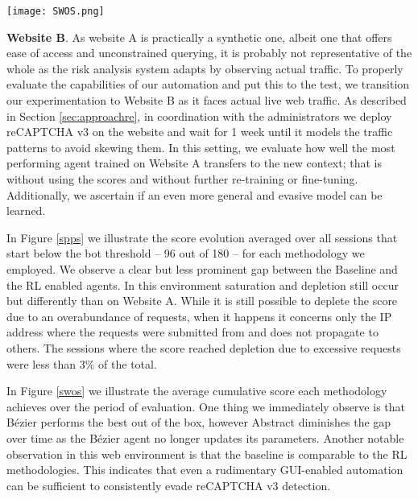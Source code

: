 \begin{figure*}[ht!]
\centerline{\texttt{[image: SWOS.png]}}
\caption{Average cumulative score over the period of evaluation, for Website A and Website B.}
\label{swos}
\end{figure*}

\textbf{Website B}. As website A is practically a synthetic one, albeit one that offers ease of access and unconstrained querying, it is probably not representative of the whole as the risk analysis system adapts by observing actual traffic.
To properly evaluate the capabilities of our automation and put this to the test, we transition our experimentation to Website B as it faces actual live web traffic.
As described in Section \ref{sec:approachre}, in coordination with the administrators we deploy reCAPTCHA v3 on the website and wait for 1 week until it models the traffic patterns to avoid skewing them.
In this setting, we evaluate how well the most performing agent trained on Website A transfers to the new context; that is without using the scores and without further re-training or fine-tuning.
Additionally, we ascertain if an even more general and evasive model can be learned.

In Figure \ref{spps} we illustrate the score evolution averaged over all sessions that start below the bot threshold -- 96 out of 180 -- for each methodology we employed.
We observe a clear but less prominent gap between the Baseline and the \gls{RL} enabled agents.
In this environment saturation and depletion still occur but differently than on Website A.
While it is still possible to deplete the score due to an overabundance of requests, when it happens it concerns only the IP address where the requests were submitted from and does not propagate to others.
The sessions where the score reached depletion due to excessive requests were less than 3\% of the total.

In Figure \ref{swos} we illustrate the average cumulative score each methodology achieves over the period of evaluation.
One thing we immediately observe is that Bézier performs the best out of the box, however Abstract diminishes the gap over time as the Bézier agent no longer updates its parameters.
Another notable observation in this web environment is that the baseline is comparable to the \gls{RL} methodologies.
This indicates that even a rudimentary GUI-enabled automation can be sufficient to consistently evade reCAPTCHA v3 detection.

